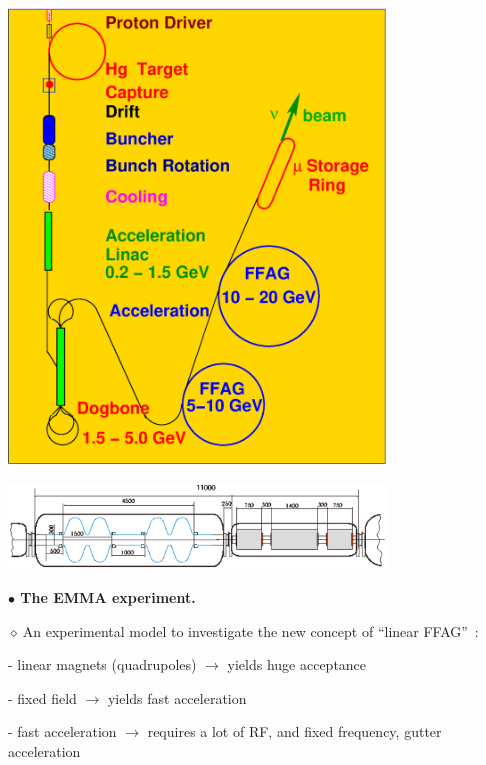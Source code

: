 \documentclass[12pt]{article}
\newcommand{\nid}{\noindent \ensuremath{\diamond~}}
\newcommand{\black}{\color{black}}
\newcommand{\red}{\color{red}}
\newcommand{\blue}{\color{blue}}
\begin{document}
\begin{minipage}[t]{.4\linewidth}

\vspace{-9mm}


\begin{center}

\includegraphics*[width=10.00cm]{./figs_FFAG_introSlides/feb17-study2a-schematics2.eps}

\includegraphics*[width=10.00cm]{./figs_FFAG_introSlides/RFCryostat.eps}

\end{center}

\end{minipage}\hspace{0mm}




\clearpage

\vspace{-10mm}

{\bf \LARGE \blue $\bullet$ The EMMA experiment. }

{\Large \nid An experimental  model to investigate the new concept of ``linear FFAG''~: 

\medskip

 - linear magnets (quadrupoles) \red $\longrightarrow$ yields huge acceptance \black

 - fixed field  \red $\longrightarrow$ yields fast acceleration 

 - fast acceleration \red $\longrightarrow$ requires a lot of RF, and fixed frequency, gutter acceleration 

\black
}
\end{document}
